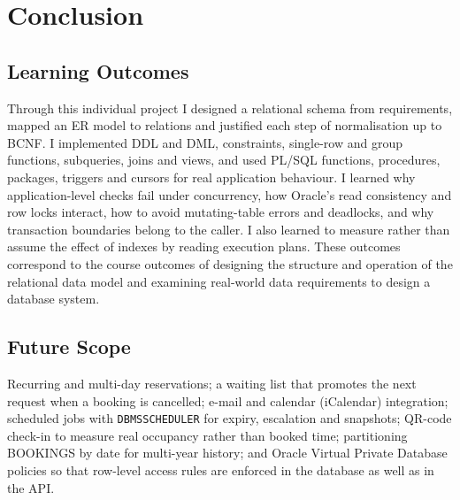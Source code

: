 \documentclass[12pt,a4paper,oneside]{report}
\renewcommand{\_}{\origus\allowbreak}
\begin{document}
\chapter{Conclusion}

\section{Learning Outcomes}
Through this individual project I designed a relational schema from requirements, mapped an ER model to relations and justified each step of normalisation up to BCNF. I implemented DDL and DML, constraints, single-row and group functions, subqueries, joins and views, and used PL/SQL functions, procedures, packages, triggers and cursors for real application behaviour. I learned why application-level checks fail under concurrency, how Oracle's read consistency and row locks interact, how to avoid mutating-table errors and deadlocks, and why transaction boundaries belong to the caller. I also learned to measure rather than assume the effect of indexes by reading execution plans. These outcomes correspond to the course outcomes of designing the structure and operation of the relational data model and examining real-world data requirements to design a database system.

\section{Future Scope}
Recurring and multi-day reservations; a waiting list that promotes the next request when a booking is cancelled; e-mail and calendar (iCalendar) integration; scheduled jobs with \texttt{DBMS\_SCHEDULER} for expiry, escalation and snapshots; QR-code check-in to measure real occupancy rather than booked time; partitioning BOOKINGS by date for multi-year history; and Oracle Virtual Private Database policies so that row-level access rules are enforced in the database as well as in the API.
\end{document}
